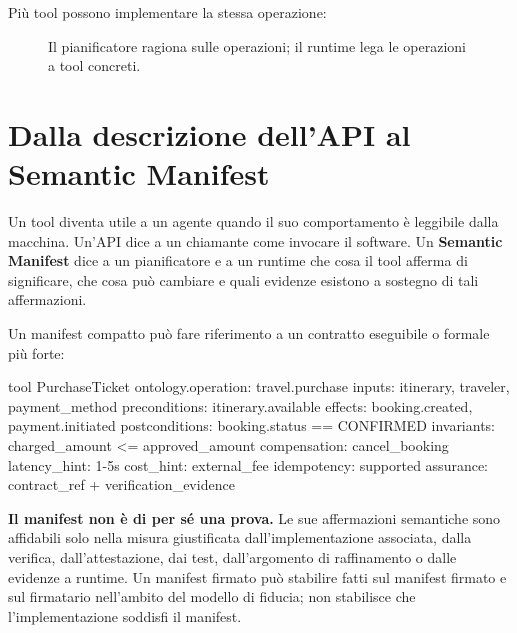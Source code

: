 \documentclass[10pt,oneside,openany]{book}
\newcommand{\term}[1]{\textbf{#1}}
\begin{document}
Più tool possono implementare la stessa operazione:

\begin{figure}[ht]
\centering
{}
\caption{Il pianificatore ragiona sulle operazioni; il runtime lega le operazioni a tool concreti.}
\end{figure}

\section{Dalla descrizione dell'API al Semantic Manifest}
Un tool diventa utile a un agente quando il suo comportamento è leggibile dalla macchina. Un'API dice a un chiamante come invocare il software. Un \term{Semantic Manifest} dice a un pianificatore e a un runtime che cosa il tool afferma di significare, che cosa può cambiare e quali evidenze esistono a sostegno di tali affermazioni.

Un manifest compatto può fare riferimento a un contratto eseguibile o formale più forte:

\begin{codeblock}
tool PurchaseTicket {
  ontology.operation: travel.purchase
  inputs: itinerary, traveler, payment_method
  preconditions: itinerary.available
  effects: booking.created, payment.initiated
  postconditions: booking.status == CONFIRMED
  invariants: charged_amount <= approved_amount
  compensation: cancel_booking
  latency_hint: 1-5s
  cost_hint: external_fee
  idempotency: supported
  assurance: contract_ref + verification_evidence
}
\end{codeblock}

\textbf{Il manifest non è di per sé una prova.} Le sue affermazioni semantiche sono affidabili solo nella misura giustificata dall'implementazione associata, dalla verifica, dall'attestazione, dai test, dall'argomento di raffinamento o dalle evidenze a runtime. Un manifest firmato può stabilire fatti sul manifest firmato e sul firmatario nell'ambito del modello di fiducia; non stabilisce che l'implementazione soddisfi il manifest.
\end{document}

